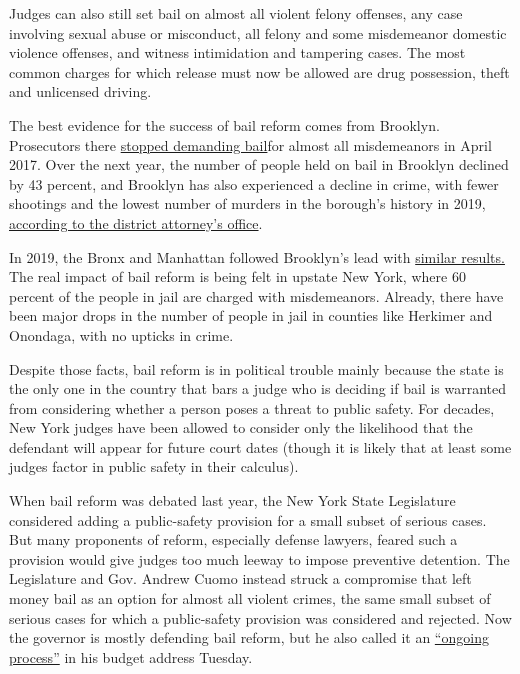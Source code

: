 Judges can also still set bail on almost all violent felony offenses,
any case involving sexual abuse or misconduct, all felony and some
misdemeanor domestic violence offenses, and witness intimidation and
tampering cases. The most common charges for which release must now be
allowed are drug possession, theft and unlicensed driving.

The best evidence for the success of bail reform comes from Brooklyn.
Prosecutors there
\href{https://www.nycja.org/publications/cja-annual-report-2017}{stopped
demanding bail}for almost all misdemeanors in April 2017. Over the next
year, the number of people held on bail in Brooklyn declined by 43
percent, and Brooklyn has also experienced a decline in crime, with
fewer shootings and the lowest number of murders in the borough's
history in 2019,
\href{http://brooklynda.org/2020/01/03/brooklyn-continued-to-record-historic-decline-in-violent-crime-in-2019/}{according
to the district attorney's office}.

In 2019, the Bronx and Manhattan followed Brooklyn's lead with
\href{https://criminaljustice.cityofnewyork.us/wp-content/uploads/2019/06/Scorecard-Jan-to-Mar-2019-TJ06072019-2-pgs.pdf}{similar
results.} The real impact of bail reform is being felt in upstate New
York, where 60 percent of the people in jail are charged with
misdemeanors. Already, there have been major drops in the number of
people in jail in counties like Herkimer and Onondaga, with no upticks
in crime.

Despite those facts, bail reform is in political trouble mainly because
the state is the only one in the country that bars a judge who is
deciding if bail is warranted from considering whether a person poses a
threat to public safety. For decades, New York judges have been allowed
to consider only the likelihood that the defendant will appear for
future court dates (though it is likely that at least some judges factor
in public safety in their calculus).

When bail reform was debated last year, the New York State Legislature
considered adding a public-safety provision for a small subset of
serious cases. But many proponents of reform, especially defense
lawyers, feared such a provision would give judges too much leeway to
impose preventive detention. The Legislature and Gov. Andrew Cuomo
instead struck a compromise that left money bail as an option for almost
all violent crimes, the same small subset of serious cases for which a
public-safety provision was considered and rejected. Now the governor is
mostly defending bail reform, but he also called it an
\href{https://www.nydailynews.com/news/politics/ny-cuomo-bail-reform-20200121-bn5gjfj5hrbjtcnxfd4vntptwi-story.html}{``ongoing
process''} in his budget address Tuesday.


